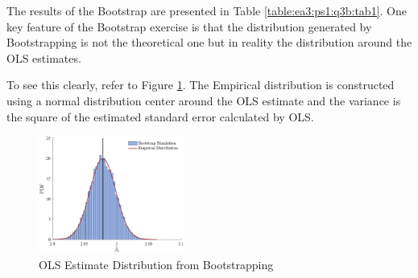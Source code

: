 \documentclass{article}
\begin{document}
\begin{solution}
The results of the Bootstrap are presented in Table \ref{table:ea3:ps1:q3b:tab1}. One key feature of the Bootstrap exercise is that the distribution generated by Bootstrapping is not the theoretical one but in reality the distribution around the OLS estimates. 

To see this clearly, refer to Figure \ref{ea3:ps1:q3b:fig1}. The Empirical distribution is constructed using a normal distribution center around the OLS estimate and the variance is the square of the estimated standard error calculated by OLS. 
\begin{figure}[htb]
    \centering
    \caption{OLS Estimate Distribution from Bootstrapping}
    \label{ea3:ps1:q3b:fig1}
    \includegraphics[width=0.43\textwidth]{Figures/p3qb.pdf}
\end{figure}
\end{solution}
\end{document}
